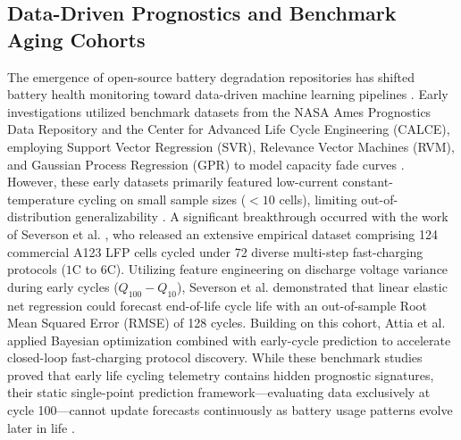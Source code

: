 \documentclass[pdflatex,sn-mathphys-num]{sn-jnl}%
\theoremstyle{thmstyleone}%
\theoremstyle{thmstyletwo}%
\theoremstyle{thmstylethree}%
\begin{document}
\subsection{Data-Driven Prognostics and Benchmark Aging Cohorts}\label{subsec:datadriven_cohorts}
The emergence of open-source battery degradation repositories has shifted battery health monitoring toward data-driven machine learning pipelines \cite{severson2019data,li2021data}. Early investigations utilized benchmark datasets from the NASA Ames Prognostics Data Repository \cite{saha2007battery} and the Center for Advanced Life Cycle Engineering (CALCE), employing Support Vector Regression (SVR), Relevance Vector Machines (RVM), and Gaussian Process Regression (GPR) to model capacity fade curves \cite{peng2019integrated,richardson2018gaussian}. However, these early datasets primarily featured low-current constant-temperature cycling on small sample sizes ($<10$ cells), limiting out-of-distribution generalizability \cite{hu2020battery}. A significant breakthrough occurred with the work of Severson et al. \cite{severson2019data}, who released an extensive empirical dataset comprising 124 commercial A123 LFP cells cycled under 72 diverse multi-step fast-charging protocols ($1\text{C}$ to $6\text{C}$). Utilizing feature engineering on discharge voltage variance during early cycles ($Q_{100} - Q_{10}$), Severson et al. demonstrated that linear elastic net regression could forecast end-of-life cycle life with an out-of-sample Root Mean Squared Error (RMSE) of 128 cycles. Building on this cohort, Attia et al. \cite{attia2020closed} applied Bayesian optimization combined with early-cycle prediction to accelerate closed-loop fast-charging protocol discovery. While these benchmark studies proved that early life cycling telemetry contains hidden prognostic signatures, their static single-point prediction framework---evaluating data exclusively at cycle 100---cannot update forecasts continuously as battery usage patterns evolve later in life \cite{severson2020prognostic}.
\end{document}

